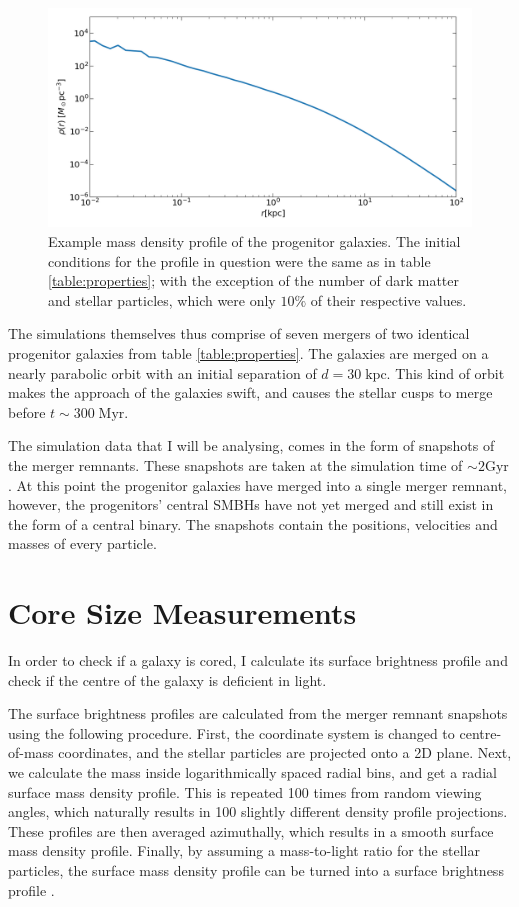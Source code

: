 \documentclass[english, oneside]{HYgradu}
\begin{document}
\begin{figure}
	\centering
	\includegraphics[width=\textwidth]{IC.png}
	\caption{Example mass density profile of the progenitor galaxies. The initial conditions for the profile in question were the same as in table \ref{table:properties}; with the exception of the number of dark matter and stellar particles, which were only $10\%$ of their respective values.}
	\label{figure:IC_density_profile}
\end{figure}

The simulations themselves thus comprise of seven mergers of two identical progenitor galaxies from table \ref{table:properties}. The galaxies are merged on a nearly parabolic orbit with an initial separation of $d = 30 \; \mathrm{kpc}$. This kind of orbit makes the approach of the galaxies swift, and causes the stellar cusps to merge before $t \sim 300 \; \mathrm{Myr}$.

The simulation data that I will be analysing, comes in the form of snapshots of the merger remnants. These snapshots are taken at the simulation time of $\sim 2 \mathrm{Gyr}$. At this point the progenitor galaxies have merged into a single merger remnant, however, the progenitors' central SMBHs have not yet merged and still exist in the form of a central binary. The snapshots contain the positions, velocities and masses of every particle.

\section{Core Size Measurements}

In order to check if a galaxy is cored, I calculate its surface brightness profile and check if the centre of the galaxy is deficient in light.

The surface brightness profiles are calculated from the merger remnant snapshots using the following procedure. First, the coordinate system is changed to centre-of-mass coordinates, and the stellar particles are projected onto a 2D plane. Next, we calculate the mass inside logarithmically spaced radial bins, and get a radial surface mass density profile. This is repeated 100 times from random viewing angles, which naturally results in 100 slightly different density profile projections. These profiles are then averaged azimuthally, which results in a smooth surface mass density profile. Finally, by assuming a mass-to-light ratio for the stellar particles, the surface mass density profile can be turned into a surface brightness profile \citep{Rantala2018}. 
\end{document}
